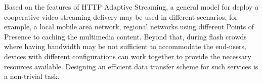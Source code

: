 Based on the features of HTTP Adaptive Streaming, a general model for deploy a cooperative video streaming delivery may be used in different scenarios, for example, a local mobile area network, regional networks using different Points of Presence to caching the multimedia content. Beyond that, during flash crowds where having bandwidth may be not sufficient to accommodate the end-users, devices with different configurations can work together to provide the necessary resources available.
Designing an efficient data transfer scheme for such services is a non-trivial task.



%
%
%	

